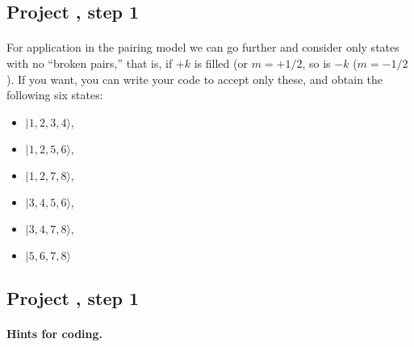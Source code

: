 \documentclass[%
twoside,                 %
final,                   %
10pt]{article}
\begin{document}
\subsection*{Project , step 1}

\paragraph{}

For application in the pairing model we can go further and consider only states with 
no ``broken pairs,'' that is, if $+k$ is filled (or $m = +1/2$, so is $-k$ ($m=-1/2$). 
If you want, you can write your code to accept only these, and obtain the following 
six states:

\begin{itemize}
\item $|           1,           2 ,          3         ,       4  \rangle , $

\item $|            1      ,     2        ,        5         ,       6 \rangle , $

\item $|            1         ,       2     ,           7         ,       8  \rangle , $

\item $|            3        ,        4      ,          5          ,      6  \rangle , $

\item $|            3        ,        4      ,          7         ,       8  \rangle , $

\item $|            5        ,        6     ,           7     ,           8  \rangle $
\end{itemize}

\noindent





\subsection*{Project , step 1}

\paragraph{Hints for coding.}
\end{document}
